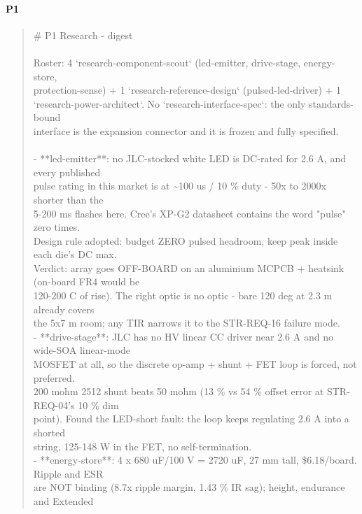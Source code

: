 \documentclass[11pt,a4paper]{article}
\begin{document}
\paragraph*{P1}
\begin{quote}\small\ttfamily\raggedright
\# P1 Research - digest\\
~\\
Roster: 4 `research-component-scout` (led-emitter, drive-stage, energy-store,\\
protection-sense) + 1 `research-reference-design` (pulsed-led-driver) + 1\\
`research-power-architect`. No `research-interface-spec`: the only standards-bound\\
interface is the expansion connector and it is frozen and fully specified.\\
~\\
- {*}{*}led-emitter{*}{*}: no JLC-stocked white LED is DC-rated for 2.6 A, and every published\\
  pulse rating in this market is at \textasciitilde{}100 us / 10 \% duty - 50x to 2000x shorter than the\\
  5-200 ms flashes here. Cree's XP-G2 datasheet contains the word "pulse" zero times.\\
  Design rule adopted: budget ZERO pulsed headroom, keep peak inside each die's DC max.\\
  Verdict: array goes OFF-BOARD on an aluminium MCPCB + heatsink (on-board FR4 would be\\
  120-200 C of rise). The right optic is no optic - bare 120 deg at 2.3 m already covers\\
  the 5x7 m room; any TIR narrows it to the STR-REQ-16 failure mode.\\
- {*}{*}drive-stage{*}{*}: JLC has no HV linear CC driver near 2.6 A and no wide-SOA linear-mode\\
  MOSFET at all, so the discrete op-amp + shunt + FET loop is forced, not preferred.\\
  200 mohm 2512 shunt beats 50 mohm (13 \% vs 54 \% offset error at STR-REQ-04's 10 \% dim\\
  point). Found the LED-short fault: the loop keeps regulating 2.6 A into a shorted\\
  string, 125-148 W in the FET, no self-termination.\\
- {*}{*}energy-store{*}{*}: 4 x 680 uF/100 V = 2720 uF, 27 mm tall, \$6.18/board. Ripple and ESR\\
  are NOT binding (8.7x ripple margin, 1.43 \% IR sag); height, endurance and Extended\\

\end{quote}
\end{document}
